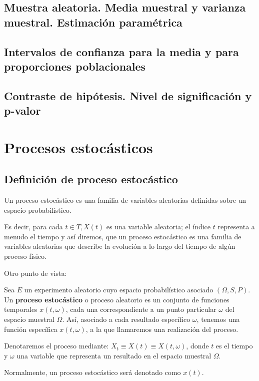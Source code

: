\documentclass[a4paper]{book}
\begin{document}
\section{Muestra aleatoria. Media muestral y varianza muestral. Estimación paramétrica}

\section{Intervalos de confianza para la media y para proporciones poblacionales}

\section{Contraste de hipótesis. Nivel de significación y p-valor}



\chapter{Procesos estocásticos}

\section{Definición de proceso estocástico}
Un proceso estocástico es una familia de variables aleatorias definidas sobre un espacio probabilístico.

Es decir, para cada $ t\in T, X(t)$ es una variable aleatoria; el índice $t$ representa a menudo el tiempo y así diremos, que un proceso estocástico es una familia de variables aleatorias que describe la evolución a lo largo del tiempo de algún proceso físico.

Otro punto de vista:

Sea $E$ un experimento aleatorio cuyo espacio probabilístico asociado $(\Omega , S, P)$. Un \textbf{proceso estocástico} o proceso aleatorio es un conjunto de funciones temporales $x(t,\omega )$, cada una correspondiente a un punto particular $\omega$ del espacio muestral $\Omega$. Así, asociado a cada resultado específico $\omega$, tenemos una función específica $x(t,\omega )$, a la que llamaremos una realización del proceso.

Denotaremos el proceso mediante: $X_t\equiv X(t) \equiv X(t,\omega )$, donde $t$ es el tiempo y $\omega$ una variable que representa un resultado en el espacio muestral $\Omega$.

Normalmente, un proceso estocástico será denotado como $x(t)$.
\end{document}

